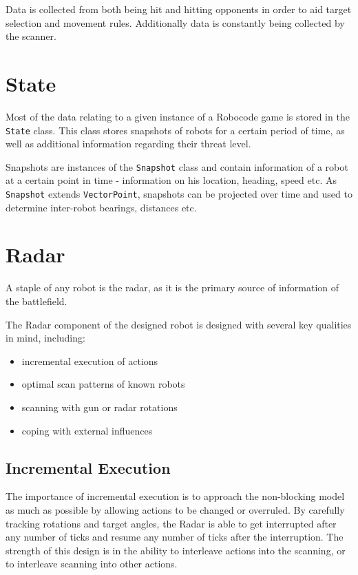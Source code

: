 \documentclass[11pt]{report}
\begin{document}
Data is collected from both being hit and hitting opponents in order to aid target selection and movement rules. Additionally data is constantly being collected by the scanner.

\section{State}
Most of the data relating to a given instance of a Robocode game is stored in the \texttt{State} class. This class stores snapshots of robots for a certain period of time, as well as additional information regarding their threat level.

Snapshots are instances of the \texttt{Snapshot} class and contain information of a robot at a certain point in time - information on his location, heading, speed etc. As \texttt{Snapshot} extends \texttt{VectorPoint}, snapshots can be projected over time and used to determine inter-robot bearings, distances etc.

\section{Radar}
A staple of any robot is the radar, as it is the primary source of information of the battlefield.

The Radar component of the designed robot is designed with several key qualities in mind, including:
\begin{itemize}
    \item incremental execution of actions %
    \item optimal scan patterns of known robots %
    \item scanning with gun or radar rotations %
    \item coping with external influences %
\end{itemize}

\subsection{Incremental Execution}
The importance of incremental execution is to approach the non-blocking model as much as possible by allowing actions to be changed or overruled. By carefully tracking rotations and target angles, the Radar is able to get interrupted after any number of ticks and resume any number of ticks after the interruption. The strength of this design is in the ability to interleave actions into the scanning, or to interleave scanning into other actions.
\end{document}
